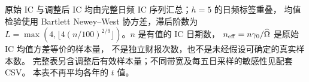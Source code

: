 原始 IC 与调整后 IC 均由完整日频 IC 序列汇总；$h=5$ 的日频标签重叠，
均值检验使用 Bartlett Newey--West 协方差，滞后阶数为
$L=\max(4,\lfloor4(n/100)^{2/9}\rfloor)$。$n$ 是有值的 IC 日期数，
$n_{\rm eff}=n\gamma_0/\widehat\Omega$ 是原始 IC 均值方差等价的样本量，
不是独立财报次数，也不是未经假设可确定的真实样本数。
完整表另含调整后有效样本量；不同带宽及每五日采样的敏感性见配套 CSV。
本表不再平均各年的 $t$ 值。